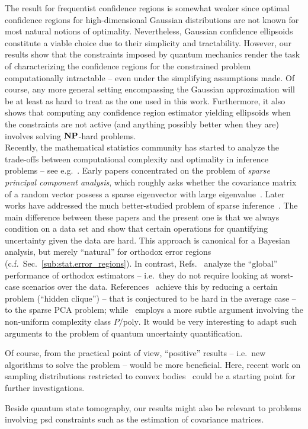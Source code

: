 The result for frequentist confidence regions is somewhat weaker since optimal confidence regions for high-dimensional Gaussian distributions are not known for most natural notions of optimality.
Nevertheless, Gaussian confidence ellipsoids constitute a viable choice due to their simplicity and tractability.
However, our results show that the constraints imposed by quantum mechanics render the task of characterizing the confidence regions for the constrained problem computationally intractable -- even under the simplifying assumptions made.
Of course, any more general setting encompassing the Gaussian approximation will be at least as hard to treat as the one used in this work.
Furthermore, it also shows that computing any confidence region estimator yielding ellipsoids when the constraints are not active (and anything possibly better when they are) involves solving $\mathbf{NP}$-hard problems.\\


Recently, the mathematical statistics community has started to analyze the trade-offs between computational complexity and optimality in inference problems -- see e.g.\
\cite{Berthet_2013_Complexity,Berthet_2013_Computational,Zhang_2014_Lower}.
Early papers concentrated on the problem of \emph{sparse principal component analysis}, which roughly asks whether the covariance matrix of a random vector possess a sparse eigenvector with large eigenvalue~\cite{Berthet_2013_Complexity,Berthet_2013_Computational,Zhang_2014_Lower}.
Later works have addressed the much better-studied problem of sparse inference~\cite{Zhang_2014_Lower}.
The main difference between these papers and the present one is that we always condition on a data set and show that certain operations for quantifying uncertainty given the data are hard.
This approach is canonical for a Bayesian analysis, but merely ``natural'' for orthodox error regions (c.f.~Sec.~\ref{sub:stat.error_regions}).
In contrast, Refs.~\cite{Berthet_2013_Complexity,Berthet_2013_Computational,Zhang_2014_Lower} analyze the ``global'' performance of orthodox estimators -- i.e.\ they do not require looking at worst-case scenarios over the data.
References~\cite{Berthet_2013_Complexity,Berthet_2013_Computational,Zhang_2014_Lower} achieve this by reducing a certain problem (``hidden clique'') -- that is conjectured to be hard in the average case -- to the sparse PCA problem; while~\cite{Zhang_2014_Lower} employs a more subtle argument involving the non-uniform complexity class $P/\mathrm{poly}$.
It would be very interesting to adapt such arguments to the problem of quantum uncertainty quantification.


Of course, from the practical point of view, ``positive'' results -- i.e.\ new algorithms to solve the problem -- would be more beneficial.
Here, recent work on sampling distributions restricted to convex bodies~\cite{Cousins_2013_Cubic,Cousins_2015_Bypassing} could be a starting point for further investigations.

Beside quantum state tomography, our results might also be relevant to problems involving psd constraints such as the estimation of covariance matrices.


